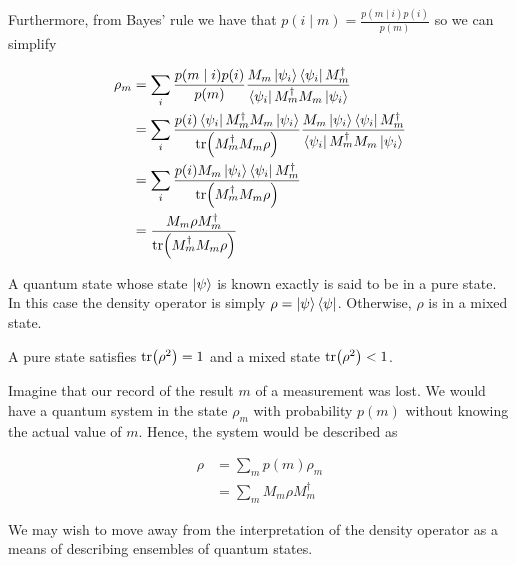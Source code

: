 \documentclass[11pt]{article}
\newcommand\0{\mathbf{0}}
\newcommand\<{\langle}
\renewcommand\>{\rangle}
\begin{document}
Furthermore, from Bayes' rule we have that $p(i \mid m) = \frac{p(m \mid i)p(i)}{p(m)}$ so we can simplify

\begin{align*}
	\rho_m &= \sum_i \frac{p(m \mid i)p(i)}{p(m)}\frac{M_m \ket{\psi_i}\bra{\psi_i}M_m^\dag}{\bra{\psi_i}M_m^\dag M_m\ket{\psi_i}} \\
	&= \sum_i \frac{p(i)\bra{\psi_i} M_m^\dag M_m \ket{\psi_i}}{\tr(M_m^\dag M_m \rho)}\frac{M_m \ket{\psi_i}\bra{\psi_i}M_m^\dag}{\bra{\psi_i}M_m^\dag M_m\ket{\psi_i}} \\
	&= \sum_i \frac{p(i)M_m \ket{\psi_i}\bra{\psi_i}M_m^\dag}{\tr(M_m^\dag M_m \rho)} \\
	&= \frac{M_m\rho M_m^\dag}{\tr(M_m^\dag M_m \rho)}
\end{align*}

A quantum state whose state $\ket{\psi}$ is known exactly is said to be in a pure state. In this case the density operator is simply $\rho = \ket{\psi}\bra{\psi}$. Otherwise, $\rho$ is in a mixed state.

A pure state satisfies $\tr(\rho^2) = 1$ and a mixed state $\tr(\rho^2) < 1$.

Imagine that our record of the result $m$ of a measurement was lost. We would have a quantum system in the state $\rho_m$ with probability $p(m)$ without knowing the actual value of $m$. Hence, the system would be described as

\begin{align*}
\rho &= \sum_m p(m) \rho_m	\\
&= \sum_m M_m \rho M_m^\dag 
\end{align*}

We may wish to move away from the interpretation of the density operator as a means of describing ensembles of quantum states.
\end{document}
